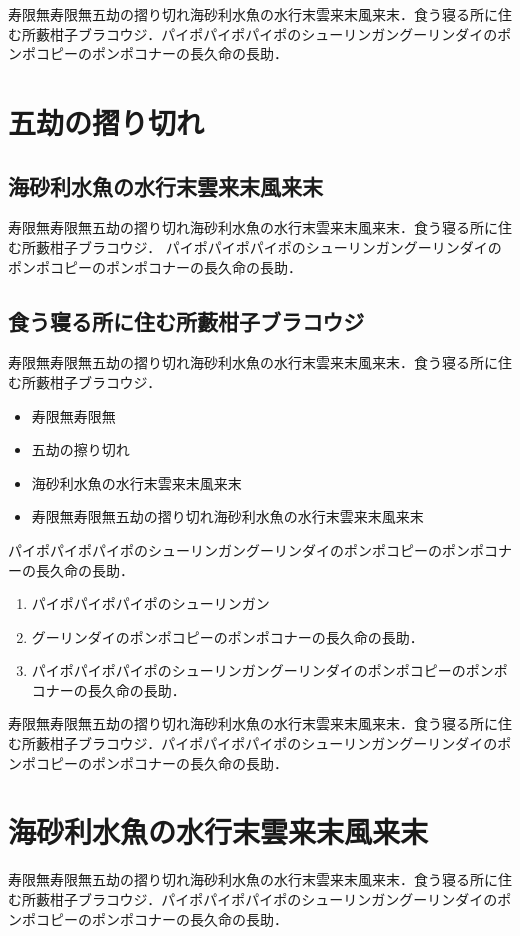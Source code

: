 \documentclass[a4j, 12Q, twocolumn, twoside]{jsarticle}
\begin{document}
寿限無寿限無五劫の摺り切れ海砂利水魚の水行末雲来末風来末．食う寝る所に住む所藪柑子ブラコウジ．パイポパイポパイポのシューリンガングーリンダイのポンポコピーのポンポコナーの長久命の長助．
\section{五劫の摺り切れ}
\subsection{海砂利水魚の水行末雲来末風来末}
寿限無寿限無五劫の摺り切れ海砂利水魚の水行末雲来末風来末．食う寝る所に住む所藪柑子ブラコウジ．
パイポパイポパイポのシューリンガングーリンダイのポンポコピーのポンポコナーの長久命の長助．
\subsection{食う寝る所に住む所藪柑子ブラコウジ}
寿限無寿限無五劫の摺り切れ海砂利水魚の水行末雲来末風来末．食う寝る所に住む所藪柑子ブラコウジ．
\begin{itemize}
  \item 寿限無寿限無 
  \item 五劫の擦り切れ
  \item 海砂利水魚の水行末雲来末風来末
  \item 寿限無寿限無五劫の摺り切れ海砂利水魚の水行末雲来末風来末
\end{itemize}
%
パイポパイポパイポのシューリンガングーリンダイのポンポコピーのポンポコナーの長久命の長助．
\begin{enumerate}
  \item パイポパイポパイポのシューリンガン
  \item グーリンダイのポンポコピーのポンポコナーの長久命の長助．
  \item パイポパイポパイポのシューリンガングーリンダイのポンポコピーのポンポコナーの長久命の長助．
\end{enumerate}
%
寿限無寿限無五劫の摺り切れ海砂利水魚の水行末雲来末風来末．食う寝る所に住む所藪柑子ブラコウジ．パイポパイポパイポのシューリンガングーリンダイのポンポコピーのポンポコナーの長久命の長助．

\section{海砂利水魚の水行末雲来末風来末}
寿限無寿限無五劫の摺り切れ海砂利水魚の水行末雲来末風来末．食う寝る所に住む所藪柑子ブラコウジ．パイポパイポパイポのシューリンガングーリンダイのポンポコピーのポンポコナーの長久命の長助．
\end{document}
